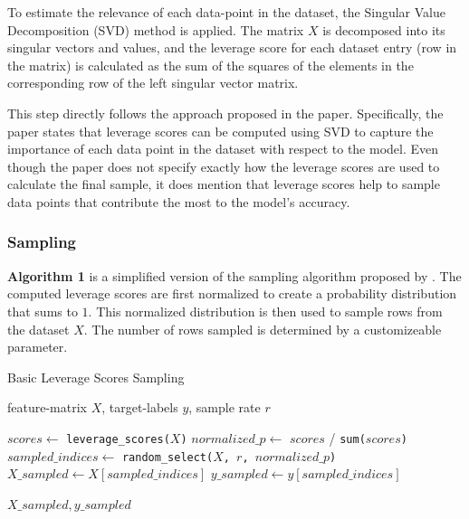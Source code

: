 \documentclass{article}
\theoremstyle{plain}
\theoremstyle{definition}
\theoremstyle{remark}
\begin{document}
To estimate the relevance of each data-point in the dataset, the Singular Value Decomposition (SVD) method is applied. The matrix $X$ is decomposed into its singular vectors and values, and the leverage score for each dataset entry (row in the matrix) is calculated as the sum of the squares of the elements in the corresponding row of the left singular vector matrix.

This step directly follows the approach proposed in the paper. Specifically, the paper states that leverage scores can be computed using SVD to capture the importance of each data point in the dataset with respect to the model. Even though the paper does not specify exactly how the leverage scores are used to calculate the final sample, it does mention that leverage scores help to sample data points that contribute the most to the model’s accuracy.


\subsubsection{Sampling}

\textbf{Algorithm 1} is a simplified version of the sampling algorithm proposed by \citet{chow24}. The computed leverage scores are first normalized to create a probability distribution that sums to $1$. This normalized distribution is then used to sample rows from the dataset $X$. The number of rows sampled is determined by a customizeable parameter.

\begin{algorithm}[tb]
   \caption{Basic Leverage Scores Sampling}
   \label{alg:example}
\begin{algorithmic}
    feature-matrix $X$, target-labels $y$, sample rate $r$

   \vspace{0.25cm}

   \STATE $scores \leftarrow$ \texttt{leverage\_scores($X$)}
   \STATE $normalized\_p \leftarrow$ $scores$ / \texttt{sum($scores$)}
   \STATE $sampled\_indices \leftarrow$ \texttt{random\_select($X$, $r$,  $normalized\_p$)}
   \STATE $X\_sampled \leftarrow X[sampled\_indices]$
   \STATE $y\_sampled \leftarrow y[sampled\_indices]$

   \vspace{0.25cm}

    \texttt{$X\_sampled, y\_sampled$}
\end{algorithmic}
\end{algorithm}
\end{document}
